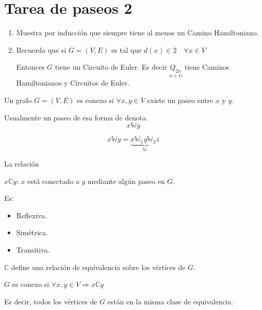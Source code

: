 \documentclass[../main.tex]{subfiles}
\begin{document}
\section{Tarea de paseos 2}%
\label{sec:tarea_de_paseos_2}

\begin{enumerate}
	\item Muestra por inducción que 
		siempre tiene al menos un Camino Hamiltoniano.
	\item Recuerda que si $G=(V,E)$ es tal que
		$d(x) \in \dot{2} \quad \forall x \in V$

		Entonces $G$ tiene un Circuito de Euler.
		\subitem Es decir
		\(
			\underset
			{
				n\in\mathbb{N}
			}
			{
				Q_{2n}
			}
		\)
		tiene Caminos Hamiltonianos y Circuitos de Euler.
\end{enumerate}


\begin{figure}[H]
	\centering
	
\end{figure}

Un grafo $G=(V,E)$ es conexo si $\forall x,y \in V$ existe un paseo entre $x$ y
$y$.

Usualmente un paseo de esa forma de denota.
\[
	x\mathbb{W}y
\]

\[
	x\mathbb{W} y =
	\underbrace
	{
		x\mathbb{W}_1y\mathbb{W}_2z
	}_
	{
		\mathbb{W}
	}
\]

\begin{figure}[H]
	\centering
	
\end{figure}


\observacion

La relación

$x\mathbb{C}y$: $x$ está conectado a $y$ mediante algún paseo en $G$.

Es:
\begin{itemize}
	\item Reflexiva.
	\item Simétrica.
	\item Transitiva.
\end{itemize}

$\mathbb{C}$ define una relación de equivalencia sobre los vértices de $G$.


$G$ es conexo si $\forall x,y\in V \Rightarrow x\mathbb{C}y$

Es decir, todos los vértices de $G$ están en la misma clase de equivalencia.
\end{document}
